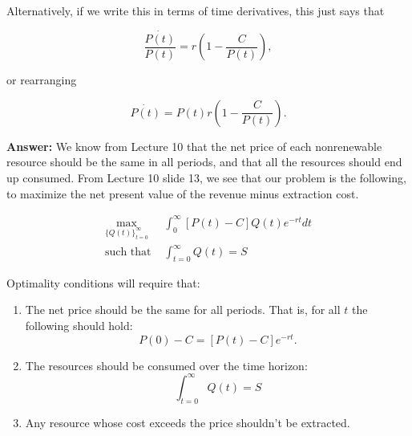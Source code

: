 \begin{enumerate}
\begin{Exercise}
\begin{sol}
    Alternatively, if we write this in terms of time derivatives, this just says that
    
        \begin{equation}
            \frac{\dot{P(t)}}{P(t)}=r\left(1-\frac{C}{P(t)}\right),
            \label{eq:opt-time-der}
        \end{equation}
        
    or rearranging
    
        \begin{equation*}
            \dot{P(t)}=P(t)r\left(1-\frac{C}{P(t)}\right).
        \end{equation*}
    
    
    
    
    
    \end{sol}
    
    
    \begin{sol}
    \textbf{Answer:} We know from Lecture 10 that the net price of each nonrenewable resource should be the same in all periods, and that all the resources should end up consumed. From Lecture 10 slide 13, we see that our problem is the following, to maximize the net present value of the revenue minus extraction cost.
    
        \begin{equation}
        \begin{split}
            \max_{ \{Q(t)\}_{t=0}^\infty} & \int_{0}^\infty \left[P(t)-C\right] Q(t) e^{-rt}dt\\
            \text{such that } & \int_{t=0}^\infty Q(t) = S
        \end{split}
        \label{eq:npv}
        \end{equation}
        
        Optimality conditions will require that:
        
        \begin{enumerate}
            \item The net price should be the same for all periods. That is, for all $t$ the following should hold:
            \begin{equation*}
                P(0)-C = [P(t)-C]e^{-rt}.
            \end{equation*}
            \item The resources should be consumed over the time horizon:
            \begin{equation*}
                \int_{t=0}^\infty Q(t) = S
            \end{equation*}
            \item Any resource whose cost exceeds the price shouldn't be extracted.
        \end{enumerate}
        

\end{sol}
\end{Exercise}
\end{enumerate}
